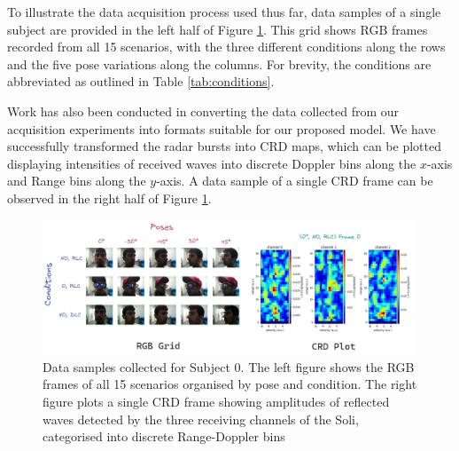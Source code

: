 \documentclass{interim}
\begin{document}
To illustrate the data acquisition process used thus far, data samples of a single subject are provided in the left half of Figure \ref{fig:rgb_crd_plot}. This grid shows RGB frames recorded from all 15 scenarios, with the three different conditions along the rows and the five pose variations along the columns. For brevity, the conditions are abbreviated as outlined in Table \ref{tab:conditions}.

\begin{table}[h!]
    \centering
    \vspace{0.5cm}
    \caption{Table displaying full forms for abbreviations describing experiment conditions.}
    \label{tab:conditions}
\end{table}

\vspace{-0.5cm}
Work has also been conducted in converting the data collected from our acquisition experiments into formats suitable for our proposed model. We have successfully transformed the radar bursts into CRD maps, which can be plotted displaying intensities of received waves into discrete Doppler bins along the $x$-axis and Range bins along the $y$-axis. A data sample of a single CRD frame can be observed in the right half of Figure \ref{fig:rgb_crd_plot}.

\begin{figure}[H]
    \centering
    \includegraphics[width=0.99\textwidth]{images/CRD_RGB_plot.pdf}
    \vspace{-0.1cm}
    \caption{Data samples collected for Subject 0. The left figure shows the RGB frames of all 15 scenarios organised by pose and condition. The right figure plots a single CRD frame showing amplitudes of reflected waves detected by the three receiving channels of the Soli, categorised into discrete Range-Doppler bins}
    \label{fig:rgb_crd_plot}
\end{figure}
\end{document}
